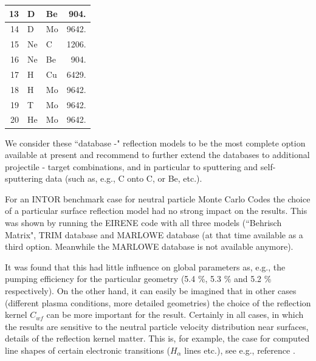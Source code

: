 \begin{table}[h]
\begin{center}
\begin{tabular}{|r|l|l|r|}
      13          & D                   & Be              & 904.   \\ \hline

      14          & D                   & Mo              & 9642.  \\ \hline

      15          & Ne                  & C               & 1206.  \\ \hline

      16          & Ne                  & Be              & 904.   \\ \hline

      17          & H                   & Cu              & 6429.  \\ \hline

      18          & H                   & Mo              & 9642.  \\ \hline

      19          & T                   & Mo              & 9642.  \\ \hline

      20          & He                  & Mo              & 9642.  \\ \hline
    \end{tabular}
  \end{center}
\end{table}

We consider these ``database -" reflection models to be the most complete
option available at present and recommend to further extend the databases to
additional projectile - target combinations, and in particular to sputtering
and self-sputtering data (such as, e.g., C onto C, or Be, etc.).

For an INTOR benchmark case for neutral particle Monte Carlo Codes
\cite{kn:Benchmark} the choice of a particular surface reflection model had no
strong impact on the results.
This was shown by running the EIRENE code with all three models (``Behrisch
Matrix", TRIM database and MARLOWE database (at that time available as a third
option.
Meanwhile the MARLOWE database is not available anymore).

It was found that this had little influence on global parameters as, e.g., the
pumping efficiency for the particular geometry (5.4 \%, 5.3 \% and 5.2 \%
respectively).
On the other hand, it can easily be imagined that in other cases (different
plasma conditions, more detailed geometries) the choice of the reflection
kernel $ C_{wf} $ can be more important for the result.
Certainly in all cases, in which the results are sensitive to the neutral
particle velocity distribution near surfaces, details of the reflection kernel
matter.
This is, for example, the case for computed line shapes of certain electronic
transitions ($ H_{\alpha} $ lines etc.), see e.g., reference
\cite{kn:Reiter92d}.

